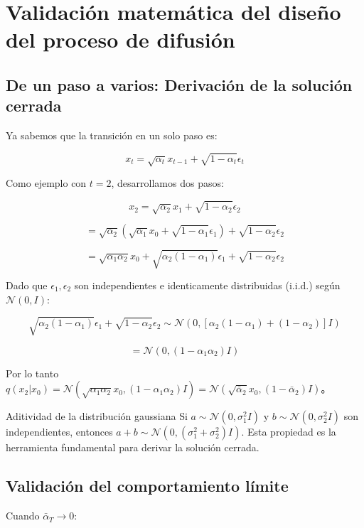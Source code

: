 \section{Validación matemática del diseño del proceso de difusión}

\subsection{De un paso a varios: Derivación de la solución cerrada}

Ya sabemos que la transición en un solo paso es:

$$x_t = \sqrt{\alpha_t} x_{t-1} + \sqrt{1 - \alpha_t} \epsilon_t$$

Como ejemplo con $t=2$, desarrollamos dos pasos:

$$x_2 = \sqrt{\alpha_2} x_1 + \sqrt{1-\alpha_2} \epsilon_2$$

$$= \sqrt{\alpha_2}(\sqrt{\alpha_1} x_0 + \sqrt{1-\alpha_1} \epsilon_1) + \sqrt{1-\alpha_2} \epsilon_2$$

$$= \sqrt{\alpha_1 \alpha_2} x_0 + \sqrt{\alpha_2(1-\alpha_1)} \epsilon_1 + \sqrt{1-\alpha_2} \epsilon_2$$

Dado que $\epsilon_1, \epsilon_2$ son independientes e identicamente distribuidas (i.i.d.) según $\mathcal{N}(0, I)$:

$$\sqrt{\alpha_2(1-\alpha_1)} \epsilon_1 + \sqrt{1-\alpha_2} \epsilon_2 \sim \mathcal{N}(0, [\alpha_2(1-\alpha_1) + (1-\alpha_2)] I)$$

$$= \mathcal{N}(0, (1 - \alpha_1 \alpha_2) I)$$

Por lo tanto $q(x_2 | x_0) = \mathcal{N}(\sqrt{\alpha_1 \alpha_2} x_0, (1 - \alpha_1 \alpha_2) I) = \mathcal{N}(\sqrt{\bar{\alpha}_2} x_0, (1-\bar{\alpha}_2) I)$。

\begin{knowledgebox}{Aditividad de la distribución gaussiana}
Si $a \sim \mathcal{N}(0, \sigma_1^2 I)$ y $b \sim \mathcal{N}(0, \sigma_2^2 I)$ son independientes, entonces $a + b \sim \mathcal{N}(0, (\sigma_1^2 + \sigma_2^2) I)$. Esta propiedad es la herramienta fundamental para derivar la solución cerrada.
\end{knowledgebox}

\subsection{Validación del comportamiento límite}

Cuando $\bar{\alpha}_T \to 0$:

